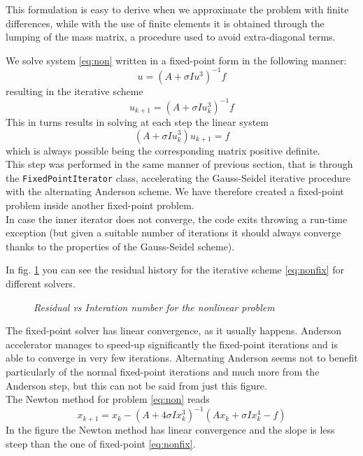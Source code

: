 \documentclass[12pt]{article}
\begin{document}
			This formulation is easy to derive when we approximate the problem with finite differences, while
			with the use of finite elements it is obtained through the lumping of the mass matrix, a procedure
			used to avoid extra-diagonal terms.
			
			We solve system \ref{eq:non} written in a fixed-point form in the following manner:
			\begin{equation}
				u = (A+ \sigma I u^3)^{-1} f 
			\end{equation}
			resulting in the iterative scheme
			\begin{equation}
				\label{eq:nonfix}
				u_{k+1}= (A+ \sigma I u^3_k)^{-1} f 
			\end{equation}
			This in turns results in solving at each step the linear system
			\begin{equation}
				(A+ \sigma I u^3_k) u_{k+1} = f
			\end{equation}
			which is always possible being the corresponding matrix positive definite.\\
			This step was performed in the same manner of previous section, that is through the
			\verb|FixedPointIterator| class, accelerating the Gauss-Seidel iterative procedure
			with the alternating Anderson scheme.
			We have therefore created a fixed-point problem inside another fixed-point problem.\\
			In case the inner iterator does not converge, the code exits throwing a run-time
			exception (but given a suitable number of iterations it should always converge
			thanks to the properties of the Gauss-Seidel scheme).
			
			In fig. \ref{fig:nonlinear} you can see the residual history for the iterative scheme \ref{eq:nonfix}
			for different solvers.
			\begin{figure}
				{\scriptsize
			}
			\centering
			\caption{\textit{Residual vs Interation number for the nonlinear problem}}
			\label{fig:nonlinear}
			\end{figure}
			The fixed-point solver has linear convergence, as it usually happens.
			Anderson accelerator manages to speed-up significantly the fixed-point iterations and is able
			to converge in very few iterations. Alternating Anderson seems not to benefit particularly of
			the normal fixed-point iterations and much more from the Anderson step, but this can not be said
			from just this figure.\\
			The Newton method for problem \ref{eq:non} reads
			\begin{equation}
				x_{k+1}= x_k - (A+4 \sigma I x_k^3)^{-1}(A x_k + \sigma I x_k^4 - f)
			\end{equation}
			In the figure the Newton method has linear convergence and the slope is less steep than
			the one of fixed-point \ref{eq:nonfix}.
						
\end{document}
